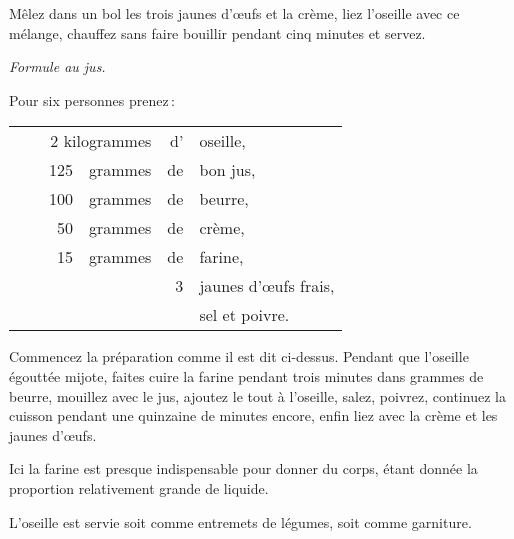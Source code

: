 Mêlez dans un bol les trois jaunes d'œufs et la crème, liez l'oseille avec ce
mélange, chauffez sans faire bouillir pendant cinq minutes et servez.

\begin{center}
\textit{Formule au jus.}
\end{center}

Pour six personnes prenez :

\footnotesize
\begin{longtable}{rrrrrp{18em}}
  & \multicolumn{3}{r}{2 kilogrammes} & d' & oseille,                                                     \\
  &  \hspace{2em} & 125 & grammes & de & bon jus,                                                         \\
  &  \hspace{2em} & 100 & grammes & de & beurre,                                                          \\
  &  \hspace{2em} &  50 & grammes & de & crème,                                                           \\
  &  \hspace{2em} &  15 & grammes & de & farine,                                                          \\
  &  \hspace{2em} &     &         &  3 & jaunes d'œufs frais,                                             \\
  &  \hspace{2em} &     &         &    & sel et poivre.                                                   \\
\end{longtable}
\normalsize

Commencez la préparation comme il est dit ci-dessus. Pendant que l'oseille
égouttée mijote, faites cuire la farine pendant trois minutes dans {\mmm}
grammes de beurre, mouillez avec le jus, ajoutez le tout à l’oseille, salez,
poivrez, continuez la cuisson pendant une quinzaine de minutes encore, enfin
liez avec la crème et les jaunes d'œufs.

Ici la farine est presque indispensable pour donner du corps, étant donnée la
proportion relativement grande de liquide.

\medskip

L'oseille est servie soit comme entremets de légumes, soit comme garniture.


